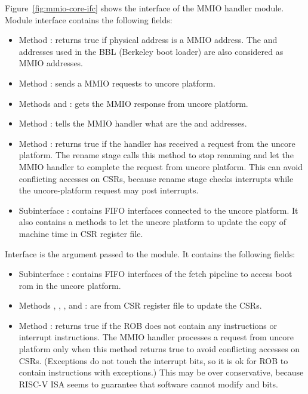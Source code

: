 Figure~\ref{fig:mmio-core-ifc} shows the interface of the MMIO handler module.
Module interface  contains the following fields:
\begin{itemize}
    \item Method : returns true if physical address  is a MMIO address.
    The  and  addresses used in the BBL (Berkeley boot loader) are also considered as MMIO addresses.
    \item Method : sends a MMIO requests to uncore platform.
    \item Methods  and : gets the MMIO response from uncore platform.
    \item Method : tells the MMIO handler what are the  and  addresses.
    \item Method : returns true if the handler has received a request from the uncore platform.
    The rename stage calls this method to stop renaming and let the MMIO handler to complete the request from uncore platform.
    This can avoid conflicting accesses on CSRs, because rename stage checks interrupts while the uncore-platform request may post interrupts.
    \item Subinterface : contains FIFO interfaces connected to the uncore platform.
    It also contains a  methods to let the uncore platform to update the copy of machine time in CSR register file.
\end{itemize}
Interface  is the argument passed  to the module.
It contains the following fields:
\begin{itemize}
    \item Subinterface : contains FIFO interfaces of the fetch pipeline to access boot rom in the uncore platform.
    \item Methods , , , and : are from CSR register file to update the CSRs.
    \item Method : returns true if the ROB  does not contain any  instructions or interrupt instructions.
    The MMIO handler processes a request from uncore platform only when this method returns true to avoid conflicting accesses on CSRs.
    (Exceptions do not touch the interrupt bits, so it is ok for ROB to contain instructions with exceptions.)
    This may be over conservative, because RISC-V ISA seems to guarantee that software cannot modify  and  bits.
\end{itemize}

